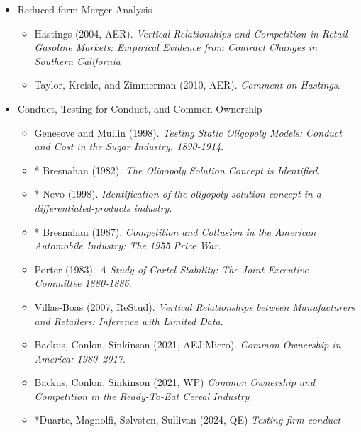 \documentclass[11pt]{article}
\begin{document}
\begin{itemize}
\begin{itemize}
\item Anderson, de Palma, Kreider (2001, JPubE). \textit{Tax Incidence in Differentiated Product Oligopoly}.
\item Miravete, Seim, Thurk (2023, IJIO). \textit{Pass-Through and Tax Incidence in Differentiated Product Markets}.
\item Sangani (2026, QJE). \textit{Complete Pass-Through in Levels}.
\end{itemize}
\item Reduced form Merger Analysis
\begin{itemize}
\item Hastings (2004, AER). \textit{Vertical Relationships and Competition in Retail Gasoline Markets: Empirical Evidence from Contract Changes in Southern California}
\item Taylor, Kreisle, and Zimmerman (2010, AER). \textit{Comment on Hastings}.
\end{itemize}
\item Conduct, Testing for Conduct, and Common Ownership
\begin{itemize}
\item Genesove and Mullin (1998). \textit{Testing Static Oligopoly Models: Conduct and Cost in the Sugar Industry, 1890-1914}.
\item * Bresnahan (1982). \textit{The Oligopoly Solution Concept is Identified}.
\item * Nevo (1998). \textit{Identification of the oligopoly solution concept in a differentiated-products industry}.
\item * Bresnahan (1987). \textit{Competition and Collusion in the American Automobile Industry: The 1955 Price War}.
\item Porter (1983). \textit{A Study of Cartel Stability: The Joint Executive Committee 1880-1886}.
\item Villas-Boas (2007, ReStud). \textit{Vertical Relationships between Manufacturers and Retailers: Inference with Limited Data}.
\item Backus, Conlon, Sinkinson (2021, AEJ:Micro). \textit{Common Ownership in America: 1980--2017}.
\item Backus, Conlon, Sinkinson (2021, WP) \textit{Common Ownership and Competition in the Ready-To-Eat Cereal Industry}
\item *Duarte, Magnolfi, S{\o}lvsten, Sullivan (2024, QE) \textit{Testing firm conduct}
\end{itemize}
\end{itemize}
\end{document}
